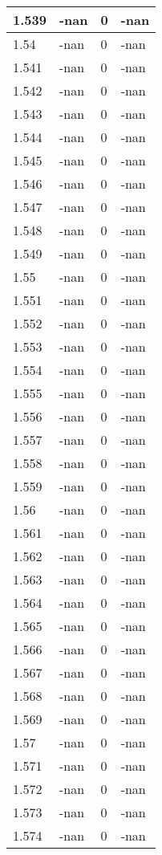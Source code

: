 \documentclass[a4paper,14pt]{extarticle}
\begin{document}
\begin{longtable}{||m{3cm}||m{3cm}|m{3cm}||m{3cm}||}
\hline
1.539 & -nan & 0 & -nan\\
\hline
1.54 & -nan & 0 & -nan\\
\hline
1.541 & -nan & 0 & -nan\\
\hline
1.542 & -nan & 0 & -nan\\
\hline
1.543 & -nan & 0 & -nan\\
\hline
1.544 & -nan & 0 & -nan\\
\hline
1.545 & -nan & 0 & -nan\\
\hline
1.546 & -nan & 0 & -nan\\
\hline
1.547 & -nan & 0 & -nan\\
\hline
1.548 & -nan & 0 & -nan\\
\hline
1.549 & -nan & 0 & -nan\\
\hline
1.55 & -nan & 0 & -nan\\
\hline
1.551 & -nan & 0 & -nan\\
\hline
1.552 & -nan & 0 & -nan\\
\hline
1.553 & -nan & 0 & -nan\\
\hline
1.554 & -nan & 0 & -nan\\
\hline
1.555 & -nan & 0 & -nan\\
\hline
1.556 & -nan & 0 & -nan\\
\hline
1.557 & -nan & 0 & -nan\\
\hline
1.558 & -nan & 0 & -nan\\
\hline
1.559 & -nan & 0 & -nan\\
\hline
1.56 & -nan & 0 & -nan\\
\hline
1.561 & -nan & 0 & -nan\\
\hline
1.562 & -nan & 0 & -nan\\
\hline
1.563 & -nan & 0 & -nan\\
\hline
1.564 & -nan & 0 & -nan\\
\hline
1.565 & -nan & 0 & -nan\\
\hline
1.566 & -nan & 0 & -nan\\
\hline
1.567 & -nan & 0 & -nan\\
\hline
1.568 & -nan & 0 & -nan\\
\hline
1.569 & -nan & 0 & -nan\\
\hline
1.57 & -nan & 0 & -nan\\
\hline
1.571 & -nan & 0 & -nan\\
\hline
1.572 & -nan & 0 & -nan\\
\hline
1.573 & -nan & 0 & -nan\\
\hline
1.574 & -nan & 0 & -nan\\

\end{longtable}
\end{document}
